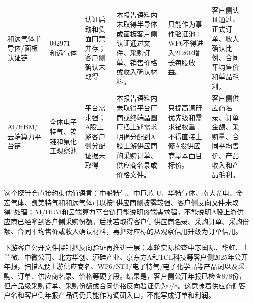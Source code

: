 \begin{exhibitbox}[客户侧验证探针]
\begin{tabularx}{\exhibitboxwidth}{L{1.65cm} L{1.45cm} L{1.75cm} X X X}
和远气体半导体/面板认证链 & 002971 和远气体 & 认证启动和负面门禁并存；客户侧确认未取得 & 本报告语料内未取得半导体或面板客户侧认证通过文件、采购订单、销售价格或收入确认材料。 & 只能作为事件验证池；WF6不得进入2026E增长每股收益。 & 客户侧认证通过、正式订单、收入确认比例、合同平均售价和单品毛利。 \\
AI/HBM/云端算力平台链 & 全体电子特气、钨链和氟化工观察池 & 平台需求强；A股上游客户侧分配证据未取得 & 本报告语料内未取得平台厂商或终端晶圆厂把上述需求明确分配到A股上游供应商的采购订单、供应商名录或价格文件。 & 只提高调研优先级和需求锚权重；不得直接上修A股供应商基本面目标价。 & 客户侧供应商名录、订单金额、采购量、合同平均售价、产品收入和产品毛利。 \\
\bottomrule
\end{tabularx}
\end{exhibitbox}

这个探针会直接约束估值语言：中船特气、中巨芯-U、华特气体、南大光电、金宏气体、凯美特气和和远气体可以按“供应商侧披露较强、客户侧反向文件未取得”处理；AI/HBM和云端算力平台链只能说明终端需求强，不能说明A股上游供应商已经拿到客户侧采购份额。后续若取得客户侧供应商名录、采购订单、采购份额、合同平均售价或收入确认材料，再把对应标的从观察信用升级为订单信用。


下游客户公开文件探针把反向验证再推进一层：本轮实际检查中芯国际、华虹、士兰微、中微公司、北方华创、沪硅产业、京东方A和TCL科技等客户侧2025年公开年报，扫描A股上游供应商名、WF6/NF3/电子特气/电子化学品等产品词以及采购、订单、供应商名录、价格等硬字段。结果是，客户侧公开年报已检查8/8份，但产品级采购订单、采购份额或合同价格反向验证仍为0/8。这意味着供应商侧客户名和客户侧年报产品词仍只能作为调研入口，不能写成订单和利润。

